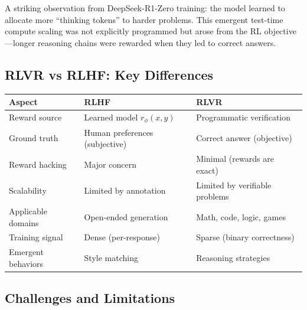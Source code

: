 \begin{remark}
    A striking observation from DeepSeek-R1-Zero training: the model learned to allocate more ``thinking tokens'' to harder problems. This emergent test-time compute scaling was not explicitly programmed but arose from the RL objective---longer reasoning chains were rewarded when they led to correct answers.
\end{remark}

\subsection{RLVR vs RLHF: Key Differences}

\begin{center}
    \renewcommand{\arraystretch}{1.4}
    \begin{tabular}{l|l|l}
        \textbf{Aspect}    & \textbf{RLHF}                  & \textbf{RLVR}                  \\
        \hline
        Reward source      & Learned model $r_\phi(x,y)$    & Programmatic verification      \\
        Ground truth       & Human preferences (subjective) & Correct answer (objective)     \\
        Reward hacking     & Major concern                  & Minimal (rewards are exact)    \\
        Scalability        & Limited by annotation          & Limited by verifiable problems \\
        Applicable domains & Open-ended generation          & Math, code, logic, games       \\
        Training signal    & Dense (per-response)           & Sparse (binary correctness)    \\
        Emergent behaviors & Style matching                 & Reasoning strategies           \\
    \end{tabular}
\end{center}

\subsection{Challenges and Limitations}

